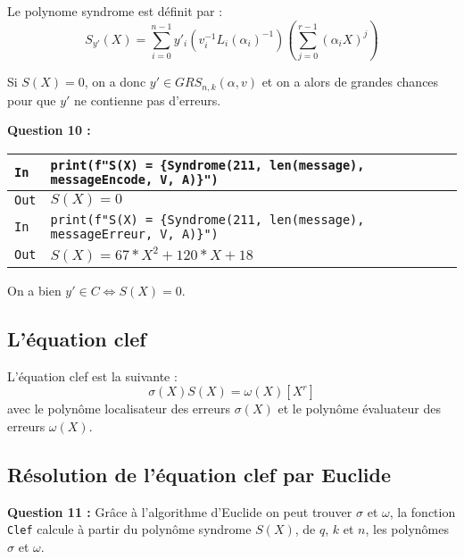\documentclass[titlepage]{article}
\begin{document}
        Le polynome syndrome est définit par : 
        \[S_{y'}(X) = \sum_{i = 0}^{n - 1}y'_i(v_i^{-1}L_i(\alpha_i)^{-1})(\sum_{j = 0}^{r - 1}(\alpha_iX)^j)\]

        Si $S(X) = 0$, on a donc $y' \in GRS_{n,k}(\alpha,v)$ et on a alors de grandes chances pour que $y'$ ne contienne pas d'erreurs.

        

        \textbf{Question 10 :}\bigbreak

        \begin{tabularx}{12cm}{|p{0.60cm}|X|}
            \hline
            \rowcolor{gray}
            \texttt{In}
            & 
            \texttt{print(f"S(X) = \{Syndrome(211, len(message), \newline
            messageEncode, V, A)\}")}
            \\
            \hline
            \texttt{Out}
            &
            \texttt{$S(X) = 0$}
            \\
            \hline
            \rowcolor{gray}
            \texttt{In}
            & 
            \texttt{print(f"S(X) = \{Syndrome(211, len(message), \newline
            messageErreur, V, A)\}")}
            \\
            \hline
            \texttt{Out}
            &
            \texttt{$S(X) = 67*X^2 + 120*X + 18$}
            \\
            \hline
        \end{tabularx}
        \bigbreak

        On a bien $y' \in C \Longleftrightarrow S(X) = 0$.

        \subsection{L’équation clef}
        L'équation clef est la suivante : 
        \[\sigma(X)S(X) = \omega(X) [X^r]\]
        avec le polynôme localisateur des erreurs $\sigma(X)$ et le polynôme évaluateur des erreurs $\omega(X)$.

        \subsection{Résolution de l’équation clef par Euclide}
        
        \textbf{Question 11 :}
        Grâce à l'algorithme d'Euclide on peut trouver $\sigma$ et $\omega$, la fonction \texttt{Clef} 
        calcule à partir du polynôme syndrome $S(X)$, de $q$, $k$ et $n$, les polynômes $\sigma$ et $\omega$.
\end{document}
